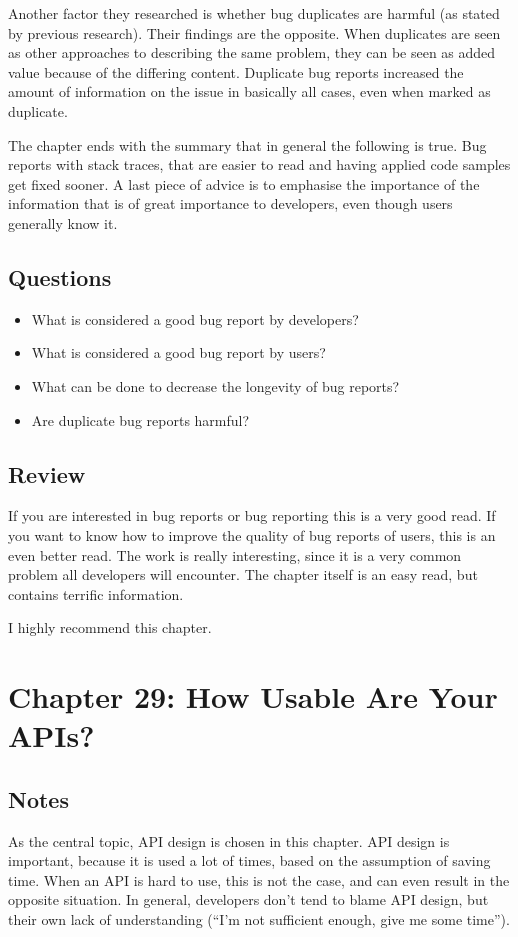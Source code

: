Another factor they researched is whether bug duplicates are harmful (as stated by previous research). 
Their findings are the opposite. 
When duplicates are seen as other approaches to describing the same problem, they can be seen as added value because of the differing content. 
Duplicate bug reports increased the amount of information on the issue in basically all cases, even when marked as duplicate.

The chapter ends with the summary that in general the following is true.
Bug reports with stack traces, that are easier to read and having applied code samples get fixed sooner.
A last piece of advice is to emphasise the importance of the information that is of great importance to developers, even though users generally know it.

\subsection{Questions}
\begin{itemize}
  \item What is considered a good bug report by developers?
  \item What is considered a good bug report by users?
  \item What can be done to decrease the longevity of bug reports?
  \item Are duplicate bug reports harmful?
\end{itemize}

\subsection{Review}
If you are interested in bug reports or bug reporting this is a very good read. 
If you want to know how to improve the quality of bug reports of users, this is an even better read. 
The work is really interesting, since it is a very common problem all developers will encounter. 
The chapter itself is an easy read, but contains terrific information.

I highly recommend this chapter.

\section{Chapter 29: How Usable Are Your APIs?}
\subsection{Notes}
As the central topic, API design is chosen in this chapter. 
API design is important, because it is used a lot of times, based on the assumption of saving time. 
When an API is hard to use, this is not the case, and can even result in the opposite situation. 
In general, developers don't tend to blame API design, but their own lack of understanding (``I'm not sufficient enough, give me some time'').

